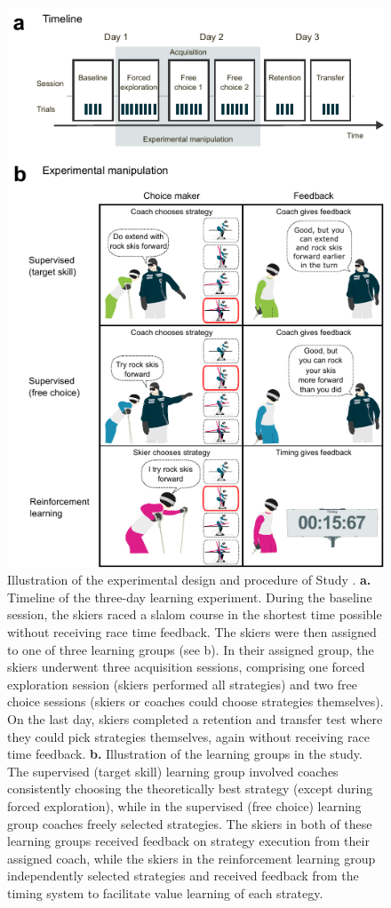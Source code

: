 \begin{figure}
\centering
\includegraphics{figure/figure_method_experiment_2.pdf}
\caption[Illustration of the experimental design and procedure of Study ]{Illustration of the experimental design and procedure of Study . \textbf{a.} Timeline of the three-day learning experiment. During the baseline session, the skiers raced a slalom course in the shortest time possible without receiving race time feedback. The skiers were then assigned to one of three learning groups (see b). In their assigned group, the skiers underwent three acquisition sessions, comprising one forced exploration session (skiers performed all strategies) and two free choice sessions (skiers or coaches could choose strategies themselves). On the last day, skiers completed a retention and transfer test where they could pick strategies themselves, again without receiving race time feedback. \textbf{b.} Illustration of the learning groups in the study. The supervised (target skill) learning group involved coaches consistently choosing the theoretically best strategy (except during forced exploration), while in the supervised (free choice) learning group coaches freely selected strategies. The skiers in both of these learning groups received feedback on strategy execution from their assigned coach, while the skiers in the reinforcement learning group independently selected strategies and received feedback from the timing system to facilitate value learning of each strategy.}\label{fig: rlillustration}

\end{figure}
